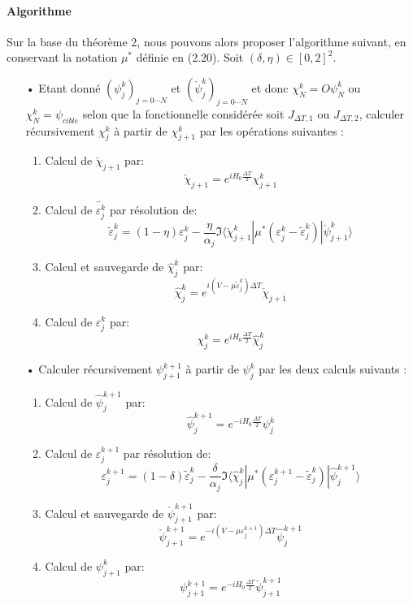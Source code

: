 \paragraph*{Algorithme}
$ $\\Sur la base du théorème 2, nous pouvons alors proposer l'algorithme suivant, en conservant la notation $\mu^*$ définie en (2.20). Soit $(\delta, \eta) \in [0, 2]^2$.

\begin{itemize}
	
	\item[•] Etant donné $ (\psi^k_j)_{j=0\cdots N}$ et $ (\check{\psi}^k_j)_{j=0\cdots N}$ et donc $\chi^k_N = O\psi^k_N$ ou $ \chi_N^k = \psi_{cible} $ selon que la
	fonctionnelle considérée soit $J_{\Delta T,1}$ ou $J_{\Delta T,2}$, calculer récursivement $\chi_j^k$ à partir de $ \chi^k_{j+1} $ par les opérations suivantes :
	
	\begin{enumerate}
		\item Calcul de $\check{\chi}_{j+1}$ par:
		$$ \check{\chi}_{j+1} = e^{iH_0\frac{\Delta T}{2}} \chi^k_{j+1} $$
		\item Calcul de $\tilde{\varepsilon_j^k}$ par résolution de:
		\begin{equation}
		\tilde{\varepsilon}_j^k = (1-\eta)\varepsilon^k_j - \frac{\eta}{\alpha_j}\Im \langle  \check{\chi}^k_{j+1}|\mu^*(\varepsilon^k_j-\tilde{\varepsilon}^k_j)|\check{\psi}^k_{j+1} \rangle
		\end{equation}
		\item Calcul et sauvegarde de $\hat{\chi}^k_j$ par:
		$$ \hat{\chi}^k_j = e^{i(V-\mu \tilde{\varepsilon}^k_j)\Delta T} \check{\chi}_{j+1} $$
		\item Calcul de $\varepsilon^k_j$ par:
		$$ \chi^k_j = e^{iH_0\frac{\Delta T}{2}} \hat{\chi}_j^k  $$
	\end{enumerate}
	
	\item[•] Calculer récursivement $ \psi^{k+1}_{j+1}$ à partir de $\psi_j^k$ par les deux calculs suivants :
	
	\begin{enumerate}
		\item Calcul de $\hat{\psi}_j^{k+1}$ par:
		$$ \hat{\psi}_j^{k+1} = e^{-iH_0\frac{\Delta T}{2}} \psi^k_j $$
		\item Calcul de $\varepsilon_j^{k+1}$ par résolution de:
		$$ \varepsilon_j^{k+1} = (1-\delta)\tilde{\varepsilon}^k_j - \frac{\delta}{\alpha_j}\Im \langle  \hat{\chi}^k_{j}|\mu^*(\varepsilon^{k+1}_j-\tilde{\varepsilon}^k_j)|\hat{\psi}^{k+1}_{j} \rangle $$
		\item Calcul et sauvegarde de $\check{\psi}^{k+1}_{j+1}$ par:
		$$ \check{\psi}^{k+1}_{j+1} = e^{-i(V-\mu \varepsilon_j^{k+1})\Delta T} \hat{\psi}_j^{k+1}  $$
		\item Calcul de $\psi^k_{j+1}$ par:
		$$ \psi^{k+1}_{j+1} = e^{-iH_0\frac{\Delta T}{2}} \check{\psi}^{k+1}_{j+1} $$
		
	\end{enumerate}
	
\end{itemize}

